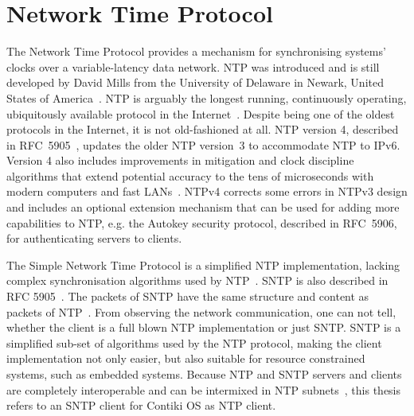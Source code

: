 
\chapter{Network Time Protocol}
The Network Time Protocol provides a mechanism for synchronising systems' clocks over a variable-latency data network.
NTP was introduced and is still developed by
David Mills from the University of Delaware in Newark, United States of America~\cite{ntp-history}.
NTP is arguably the longest running, continuously operating,
ubiquitously available protocol in the Internet~\cite{ntp-overview}.
Despite being one of the oldest protocols in the Internet, it is not old-fashioned at all.
NTP version 4, described in RFC~5905~\cite{rfc5905}, updates the older NTP version~3 to accommodate NTP to IPv6.
Version 4 also includes improvements in
mitigation and clock discipline algorithms that extend
potential accuracy to the tens of microseconds with modern
computers and fast LANs~\cite{rfc5905}.
NTPv4 corrects some
errors in NTPv3 design and includes an optional extension mechanism
that can be used for adding more capabilities to NTP, e.g. the
Autokey security protocol, described in RFC~5906,
for authenticating servers to clients.

The Simple Network Time Protocol is a simplified NTP implementation, lacking complex
synchronisation algorithms used by NTP~\cite{rfc5905}.
SNTP is also described in RFC 5905~\cite{rfc5905}.
The packets of SNTP have the same structure and content as packets of NTP~\cite{rfc5905}.
From observing the network communication, one can not tell, whether the client
is a full blown NTP implementation or just SNTP.
SNTP is a simplified sub-set of algorithms used by the NTP protocol,
making the client implementation not only easier, but also suitable for
resource constrained systems, such as embedded systems.
Because NTP and SNTP servers and clients are
completely interoperable and can be intermixed in NTP subnets~\cite{rfc5905},
this thesis refers to an SNTP client for Contiki OS as NTP client.










